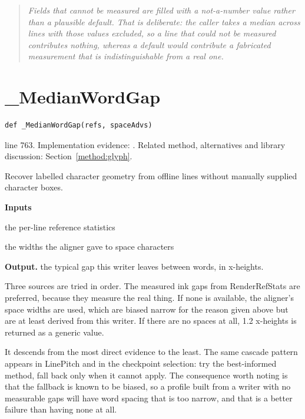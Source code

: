 \begin{quote}\small\itshape Fields that cannot be measured are filled with a not-a-number value rather than a plausible default. That is deliberate: the caller takes a median across lines with those values excluded, so a line that could not be measured contributes nothing, whereas a default would contribute a fabricated measurement that is indistinguishable from a real one.\end{quote}


\section{\_MedianWordGap}\label{fn:style:-MedianWordGap}
\begin{lstlisting}[style=sig]
def _MedianWordGap(refs, spaceAdvs)
\end{lstlisting}
 line 763. Implementation evidence: \cite{code2026}. Related method, alternatives and library discussion: Section~\ref{method:glyph}.


Recover labelled character geometry from offline lines without manually supplied character boxes.




\noindent\textbf{Inputs}
\begin{description}[leftmargin=2.2em,style=nextline,font=\normalfont\ttfamily]\setlength\itemsep{1pt}
  \item[{refs}] \normalfont the per-line reference statistics
  \item[{spaceAdvs}] \normalfont the widths the aligner gave to space characters
\end{description}

\noindent\textbf{Output.} the typical gap this writer leaves between words, in x-heights.


Three sources are tried in order. The measured ink gaps from RenderRefStats are preferred, because they measure the real thing. If none is available, the aligner's space widths are used, which are biased narrow for the reason given above but are at least derived from this writer. If there are no spaces at all, 1.2 x-heights is returned as a generic value.


It descends from the most direct evidence to the least. The same cascade pattern appears in LinePitch and in the checkpoint selection: try the best-informed method, fall back only when it cannot apply. The consequence worth noting is that the fallback is known to be biased, so a profile built from a writer with no measurable gaps will have word spacing that is too narrow, and that is a better failure than having none at all.


